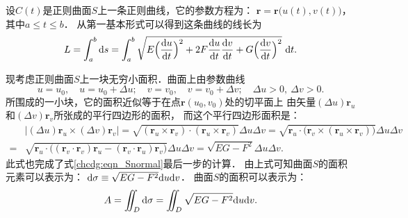 设$C(t)$是正则曲面$S$上一条正则曲线，它的参数方程为：
$\boldsymbol{r}=\boldsymbol{r}\bigl(u(t),v(t)\bigr)$，其中$a\leqslant t\leqslant b$．
从第一基本形式可以得到这条曲线的线长为
\begin{equation}
    L=\int_{a}^{b} {\rm d}s = \int_{a}^{b}
    \sqrt{E \Bigl(\frac{{\rm d}u }{{\rm d}t}\Bigr)^2 
      + 2 F \frac{{\rm d}u }{{\rm d}t} \frac{{\rm d}v }{{\rm d}t} 
      + G \Bigl(\frac{{\rm d}v }{{\rm d}t}\Bigr)^2 } \ {\rm d}t.
\end{equation}


现考虑正则曲面$S$上一块无穷小面积．曲面上由参数曲线
\begin{equation}
    u=u_0,\quad u=u_0+\Delta u;\quad v=v_0,\quad  v=v_0+\Delta v ;
    \quad \Delta u>0,\  \Delta v >0 .
\end{equation}
所围成的一小块，它的面积近似等于在点$\boldsymbol{r}(u_0,v_0)$处的切平面上
由矢量$(\Delta u) \boldsymbol{r}_u$和$(\Delta v) \boldsymbol{r}_v$所张成的平行四边形的面积，
而这个平行四边形面积是：
\setlength{\mathindent}{0em}
\begin{align*}
    &\bigl|(\Delta u) \boldsymbol{r}_u \times (\Delta v) \boldsymbol{r}_v \bigr|
    =\sqrt{(\boldsymbol{r}_u \times \boldsymbol{r}_v)\cdot (\boldsymbol{r}_u 
        \times \boldsymbol{r}_v) } \Delta u \Delta v 
    =\sqrt{\boldsymbol{r}_u \cdot \bigl( \boldsymbol{r}_v\times 
        (\boldsymbol{r}_u \times \boldsymbol{r}_v) \bigr)} \Delta u \Delta v \\
    =&\sqrt{\boldsymbol{r}_u \cdot \bigl( (\boldsymbol{r}_v\cdot\boldsymbol{r}_v)\boldsymbol{r}_u  
        -(\boldsymbol{r}_v \cdot \boldsymbol{r}_u)\boldsymbol{r}_v \bigr)} \Delta u \Delta v 
    =\sqrt{EG-F^2}    \Delta u \Delta v  .
\end{align*}\setlength{\mathindent}{2em}
此式也完成了式\eqref{chcdg:eqn_Snormal}最后一步的计算．
由上式可知曲面$S$的{\heiti 面积元素}可以表示为：
$    {\rm d}\sigma \equiv \sqrt{EG-F^2}    {\rm d} u {\rm d} v $．
曲面$S$的面积可以表示为：
\begin{equation}
    A=\iint_D {\rm d}\sigma = \iint_D \sqrt{EG-F^2}    {\rm d} u {\rm d} v .
\end{equation}



